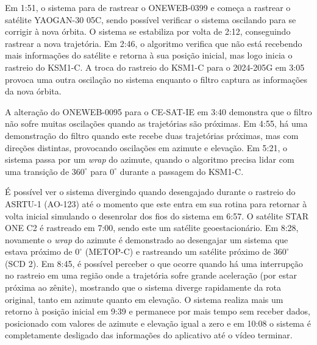 \begin{apendicesenv}
Em 1:51, o sistema para de rastrear o ONEWEB-0399 e começa a rastrear o satélite YAOGAN-30 05C, sendo possível verificar o sistema oscilando para se corrigir à nova órbita.
O sistema se estabiliza por volta de 2:12, conseguindo rastrear a nova trajetória.
Em 2:46, o algoritmo verifica que não está recebendo mais informações do satélite e retorna à sua posição inicial, mas logo inicia o rastreio do KSM1-C.
A troca do rastreio do KSM1-C para o 2024-205G em 3:05 provoca uma outra oscilação no sistema enquanto o filtro captura as informações da nova órbita.

A alteração do ONEWEB-0095 para o CE-SAT-IE em 3:40 demonstra que o filtro não sofre muitas oscilações quando as trajetórias são próximas.
Em 4:55, há uma demonstração do filtro quando este recebe duas trajetórias próximas, mas com direções distintas, provocando oscilações em azimute e elevação.
Em 5:21, o sistema passa por um \textit{wrap} do azimute, quando o algoritmo precisa lidar com uma transição de $360^{\circ}$ para $0^{\circ}$ durante a passagem do KSM1-C.

É possível ver o sistema divergindo quando desengajado durante o rastreio do ASRTU-1 (AO-123) até o momento que este entra em sua rotina para retornar à volta inicial simulando o desenrolar dos fios do sistema em 6:57.
O satélite STAR ONE C2 é rastreado em 7:00, sendo este um satélite geoestacionário.
Em 8:28, novamente o \textit{wrap} do azimute é demonstrado ao desengajar um sistema que estava próximo de $0^{\circ}$ (METOP-C) e rastreando um satélite próximo de $360^{\circ}$ (SCD 2).
Em 8:45, é possível perceber o que ocorre quando há uma interrupção no rastreio em uma região onde a trajetória sofre grande aceleração (por estar próxima ao zênite), mostrando que o sistema diverge rapidamente da rota original, tanto em azimute quanto em elevação.
O sistema realiza mais um retorno à posição inicial em 9:39 e permanece por mais tempo sem receber dados, posicionado com valores de azimute e elevação igual a zero e em 10:08 o sistema é completamente desligado das informações do aplicativo até o vídeo terminar.


\end{apendicesenv}
